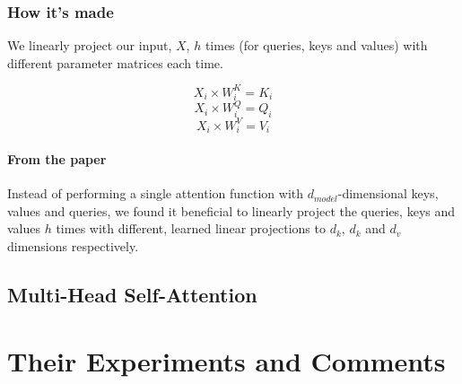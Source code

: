 \documentclass{article}
\begin{document}
    \subsubsection{How it's made}
    We linearly project our input, $X$, $h$ times (for queries, keys and values) with different parameter matrices each time.

    \[ X_i \times W_i^K = K_i\]
    \[ X_i \times W_i^Q = Q_i \]
    \[ X_i \times W_i^V = V_i \]

    \paragraph{From the paper} Instead of performing a single attention function with
    \linebreak
    $d_{model}$-dimensional keys, values and queries, we found it beneficial to linearly project the queries, keys and values $h$ times with different, learned linear projections to $d_k$, $d_k$ and $d_v$ dimensions respectively.

    \subsection{Multi-Head Self-Attention}

    \section{Their Experiments and Comments}
\end{document}
